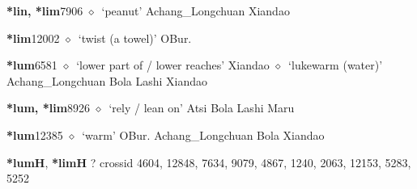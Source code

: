   \begin{list}{}{\leftmargin=1.5em \itemindent=-1.5em}
  \item {\footnotesize \textbf{*lin, *lim}}{\tiny 7906}
         $\diamond$~`peanut'
         Achang\_Longchuan 
\hspace{1ex}
         Xiandao 
  \item {\footnotesize \textbf{*lim}}{\tiny 12002}
\hspace{1ex}
         $\diamond$~`twist (a towel)'
         OBur. 
  \item {\footnotesize \textbf{*lum}}{\tiny 6581}
\hspace{1ex}
         $\diamond$~`lower part of / lower reaches'
         Xiandao 
\hspace{1ex}
         $\diamond$~`lukewarm (water)'
         Achang\_Longchuan 
\hspace{1ex}
         Bola 
\hspace{1ex}
         Lashi 
\hspace{1ex}
         Xiandao 
  \item {\footnotesize \textbf{*lum, *lim}}{\tiny 8926}
\hspace{1ex}
         $\diamond$~`rely / lean on'
         Atsi 
\hspace{1ex}
         Bola 
\hspace{1ex}
         Lashi 
\hspace{1ex}
         Maru 
  \item {\footnotesize \textbf{*lum}}{\tiny 12385}
\hspace{1ex}
         $\diamond$~`warm'
         OBur. 
\hspace{1ex}
         Achang\_Longchuan 
\hspace{1ex}
         Bola 
\hspace{1ex}
         Xiandao 
  \end{list}
\item
\textbf{*lumH}, \textbf{*limH}
?
  {\tiny crossid 4604, 12848, 7634, 9079, 4867, 1240, 2063, 12153, 5283, 5252}
